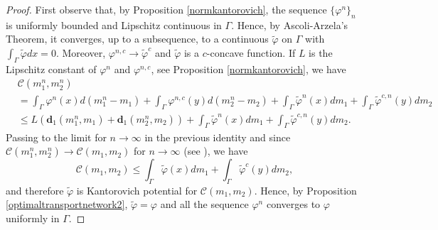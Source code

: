 \documentclass[smallextended,referee,envcountsect,]{svjour3}
\newcommand{\lra}{\longrightarrow}
\newcommand{\Wass}{\mathbf{d}}
\newcommand{\G}{\Gamma}
\newcommand{\cC}{{\mathcal C}}
\renewcommand{\phi}{\varphi}
\begin{document}
\begin{proof}
First observe that, by Proposition \ref{normkantorovich}, the sequence $\{\phi^n\}_n$ is uniformly bounded and  Lipschitz continuous in $\G$. Hence, by Ascoli-Arzela's Theorem, it converges, up to a subsequence, to a continuous $\tilde \phi$ on $\G$ with $\int_\G\tilde\phi dx=0$. Moreover, $\phi^{n,c}\lra\tilde\phi^c$ and $\tilde\phi$ is a $c$-concave function.
If $L$ is the Lipschitz constant of $\phi^{n}$ and $\phi^{n,c}$, see Proposition \ref{normkantorovich}, we have
\begin{align*}
	& \cC(m_1^n,m_2^n)\\
&	=\int_{\Gamma} \phi^n(x) d(m^n_1-m_1)+\int_{\Gamma}\phi^{n,c}(y)d(m^n_2-m_2)+
	\int_{\Gamma}\tilde\phi^n(x) dm_1+\int_{\Gamma}\tilde\phi^{c,n}(y)dm_2\\
&\le L(\Wass_1(m^n_1,m_1)+\Wass_1(m^n_2,m_2))+	 
\int_{\Gamma}\tilde\phi^n(x) dm_1+\int_{\Gamma}\tilde\phi^{c,n}(y)dm_2.
\end{align*}
Passing to the limit for $n\to\infty$ in the previous identity and since $ \cC(m^n_1,m^n_2)\lra  \cC(m_1,m_2)$ for $n\to \infty$  (see \cite[theorem 5.20]{villani2}), we have
\[ \cC(m_1,m_2)\le \int_{\Gamma}\tilde\phi(x) dm_1+\int_{\Gamma}\tilde\phi^c(y)dm_2 ,  \]
and therefore $\tilde \phi$ is Kantorovich potential for $ \cC(m_1,m_2)$. Hence, by Proposition  \ref{optimaltransportnetwork2}, $\tilde \phi=\phi$ and all the sequence $\phi^n$ converges to $\phi$ uniformly in $\G$.
\end{proof}
\end{document}
